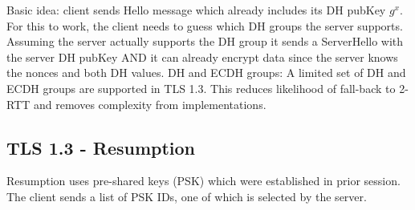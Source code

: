 \documentclass[11pt,oneside,a4paper]{article}
\begin{document}
Basic idea: client sends Hello message which already includes its DH pubKey $g^x$. For this to work, the client needs to guess which DH groups the server supports.
Assuming the server actually supports the DH group it sends a ServerHello with the server DH pubKey AND it can already encrypt data since the server knows the nonces and both DH values.
DH and ECDH groups: A limited set of DH and ECDH groups are supported in TLS 1.3. This reduces likelihood of fall-back to 2-RTT and removes complexity from implementations.

\subsection{TLS 1.3 - Resumption}

Resumption uses pre-shared keys (PSK) which were established in prior session. The client sends a list of PSK IDs, one of which is selected by the server.
















\label{lastpage} %
\clearpage
{}



\clearpage
\appendix
{}
\end{document}
